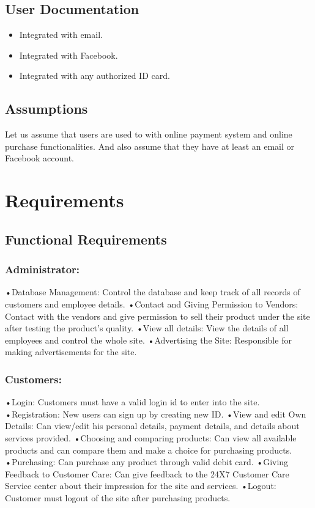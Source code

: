 \documentclass{article}
\begin{document}
\subsection{User Documentation}
\begin{itemize}
\item Integrated with email.
\item Integrated with Facebook.
\item Integrated with any authorized ID card.
\end{itemize}
\subsection{Assumptions}
Let us assume that users are used to with online payment system and online purchase functionalities. And also assume that they have at least an email or Facebook account.
\section{Requirements}
\subsection{Functional Requirements}
\subsubsection{Administrator:}
•{Database Management:} Control the database and keep track of all records of customers and employee details.
•{Contact and Giving Permission to Vendors:} Contact with the vendors and give permission to sell their product under the site after testing the product’s quality.
•{View all details}: View the details of all employees and control the whole site.
•{Advertising the Site}: Responsible for making advertisements for the site.
\subsubsection{Customers:}
    •Login: Customers must have a valid login id to enter into the site.
	•Registration: New users can sign up by creating new ID.
	•View and edit Own Details: Can view/edit his personal details, payment details, and details about services provided.
	•Choosing and comparing products: Can view all available products and can compare them and make a choice for purchasing 		products.
	•Purchasing: Can purchase any product through valid debit card.
	•Giving Feedback to Customer Care: Can give feedback to the 24X7 Customer Care Service center about their impression for the 		site and services.
	•Logout: Customer must logout of the site after purchasing products.
\end{document}
